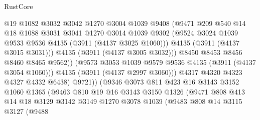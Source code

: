 \begin{lexlean}{RustCore}
\begin{coremodule}
                                @19
                                @1082
                                @3032
                                @3042
                                @1270
                                @3004
                                @1039
                                @9408
                                (@9471
                                  @209
                                  @540
                                  @14
                                  @18
                                  @1088
                                  @3031
                                  @3041
                                  @1270
                                  @3014
                                  @1039
                                  @9302
                                  (@9524 @3024 @1039 @9533 @9536 @4135 (@3911 (@4137 @3025 @1060)))
                                  @4135
                                  (@3911 (@4137 @3015 @3031)))
                                @4135
                                (@3911 (@4137 @3005 @3032)))
                              @8450
                              @8453
                              @8456
                              @8460
                              @8465
                              @9562))
                          (@9573 @3053 @1039 @9579 @9536 @4135 (@3911 (@4137 @3054 @1060)))
                          @4135
                          (@3911 (@4137 @2997 @3060)))
                        @4317
                        @4320
                        @4323
                        @4327
                        @4332
                        @6438)
                      @9721))
                  (@9346
                    @3073
                    @811
                    @423
                    @16
                    @3143
                    @3152
                    @1060
                    @1365
                    (@9463
                      @810
                      @19
                      @16
                      @3143
                      @3150
                      @1326
                      (@9471
                        @808
                        @413
                        @14
                        @18
                        @3129
                        @3142
                        @3149
                        @1270
                        @3078
                        @1039
                        (@9483
                          @808
                          @14
                          @3115
                          @3127
                          (@9488

\end{coremodule}
\end{lexlean}

